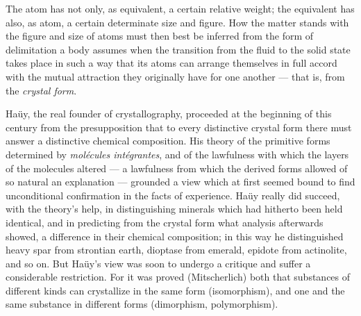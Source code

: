 \documentclass[12pt,a4paper]{book}
\begin{document}
The atom has not only, as equivalent, a certain relative weight; the
equivalent has also, as atom, a certain determinate size and figure. How the
matter stands with the figure and size of atoms must then best be inferred from
the form of delimitation a body assumes when the transition from the fluid to
the solid state takes place in such a way that its atoms can arrange themselves
in full accord with the mutual attraction they originally have for one another
--- that is, from the \emph{crystal form}.

Haüy, the real founder of crystallography, proceeded at the beginning of this
century from the presupposition that to every distinctive crystal form there
must answer a distinctive chemical composition. His theory of the primitive
forms determined by \textit{molécules intégrantes}, and of the lawfulness with
which the layers of the molecules altered --- a lawfulness from which the
derived forms allowed of so natural an explanation --- grounded a view which at
first seemed bound to find unconditional confirmation in the facts of
experience. Haüy really did succeed, with the theory's help, in distinguishing
minerals which had hitherto been held identical, and in predicting from the
crystal form what analysis afterwards showed, a difference in their chemical
composition; in this way he distinguished heavy spar from strontian earth,
dioptase from emerald, epidote from actinolite, and so on. But Haüy's view was
soon to undergo a critique and suffer a considerable restriction. For it was
proved (Mitscherlich) both that substances of different kinds can crystallize
in the same form (isomorphism), and one and the same substance in different
forms (dimorphism, polymorphism).
\end{document}
